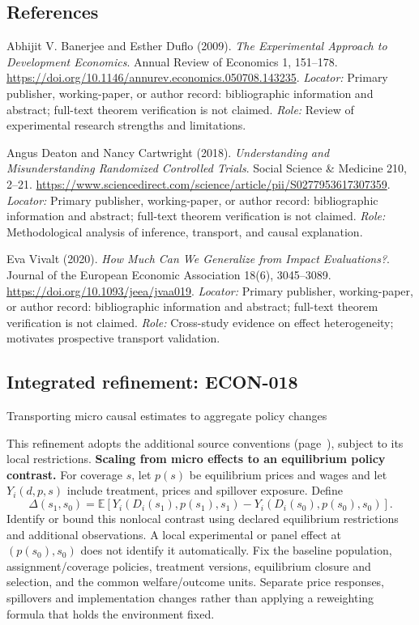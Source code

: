 \documentclass[11pt,a4paper]{article}
\begin{document}
\subsection*{References}
\begin{enumerate}[label=\textnormal{[S\arabic*]},leftmargin=*]
\item Abhijit V. Banerjee and Esther Duflo (2009). \emph{The Experimental Approach to Development Economics}. Annual Review of Economics 1, 151--178. \url{https://doi.org/10.1146/annurev.economics.050708.143235}. \textit{Locator:} Primary publisher, working-paper, or author record: bibliographic information and abstract; full-text theorem verification is not claimed. \textit{Role:} Review of experimental research strengths and limitations.
\item Angus Deaton and Nancy Cartwright (2018). \emph{Understanding and Misunderstanding Randomized Controlled Trials}. Social Science \& Medicine 210, 2--21. \url{https://www.sciencedirect.com/science/article/pii/S0277953617307359}. \textit{Locator:} Primary publisher, working-paper, or author record: bibliographic information and abstract; full-text theorem verification is not claimed. \textit{Role:} Methodological analysis of inference, transport, and causal explanation.
\item Eva Vivalt (2020). \emph{How Much Can We Generalize from Impact Evaluations?}. Journal of the European Economic Association 18(6), 3045--3089. \url{https://doi.org/10.1093/jeea/jvaa019}. \textit{Locator:} Primary publisher, working-paper, or author record: bibliographic information and abstract; full-text theorem verification is not claimed. \textit{Role:} Cross-study evidence on effect heterogeneity; motivates prospective transport validation.
\end{enumerate}

\subsection*{Integrated refinement: ECON-018}
{\sffamily\small\color{muted}Transporting micro causal estimates to aggregate policy changes\par}
This refinement adopts the additional source conventions
(page~\pageref{audited:conventions}), subject to its local restrictions.
\textbf{Scaling from micro effects to an equilibrium policy contrast.}
For coverage $s$, let $p(s)$ be equilibrium prices and wages and let
$Y_i(d,p,s)$ include treatment, prices and spillover exposure. Define
\[
\Delta(s_1,s_0)=\mathbb E[Y_i(D_i(s_1),p(s_1),s_1)
                         -Y_i(D_i(s_0),p(s_0),s_0)].
\]
Identify or bound this nonlocal contrast using declared equilibrium restrictions
and additional observations. A local experimental or panel effect at
$(p(s_0),s_0)$ does not identify it automatically. Fix the baseline population,
assignment/coverage policies, treatment versions, equilibrium closure and
selection, and the common welfare/outcome units. Separate price responses,
spillovers and implementation changes rather than applying a reweighting formula
that holds the environment fixed.
\end{document}
